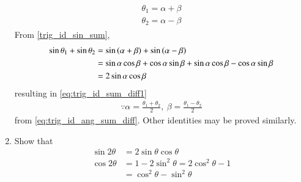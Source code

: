 \begin{enumerate}[label=\thesubsection.\arabic*.,ref=\thesubsection.\theenumi]
\begin{align}
\begin{split}
\theta_1 = \alpha + \beta
\\
\theta_2 = \alpha - \beta
\end{split}
\end{align}
%
From \eqref{trig_id_sin_sum},
%
\begin{align}
\sin \theta_1 + \sin \theta_2  &= \sin \left(\alpha + \beta\right) + \sin \left(\alpha - \beta\right)
\\
&= \sin \alpha \cos \beta + \cos \alpha \sin \beta 
+\sin \alpha \cos \beta - \cos \alpha \sin \beta
\\
&= 2 \sin \alpha \cos \beta
\end{align}
%
resulting in \eqref{eq:trig_id_sum_diff1}
%
\begin{align}
\because \alpha = \frac{\theta_1 +\theta_2}{2}
,\
\beta = \frac{\theta_1 -\theta_2}{2}
\end{align}
from \eqref{eq:trig_id_ang_sum_diff}.  Other identities may be proved similarly.
%
\item Show that 
  \begin{align}
\label{eq:trig-id-2A-sin}
	  \sin 2 \theta &= 2 \sin \theta \cos \theta
	  \\
	  \cos 2 \theta &= 1 - 2 \sin^2 \theta 
	  =  2 \cos^2 \theta -1
	  \\
	  &= \cos^2 \theta -\sin^2 \theta 
\label{eq:trig-id-2A-cos}
  \end{align}
\end{enumerate}
%
